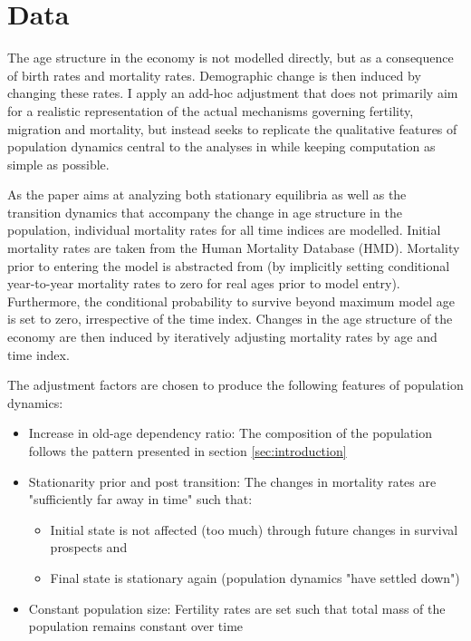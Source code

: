 \section{Data}
\label{sec:data}

The age structure in the economy is not modelled directly, but as a consequence of birth rates and mortality rates. Demographic change is then induced by changing these rates. I apply an add-hoc adjustment that does not primarily aim for a realistic representation of the actual mechanisms governing fertility, migration and mortality, but instead seeks to replicate the qualitative features of population dynamics central to the analyses in \cite{LudwigSchelkleVogel2012} while keeping computation as simple as possible.

As the paper aims at analyzing both stationary equilibria as well as the transition dynamics that accompany the change in age structure in the population, individual mortality rates for all time indices are modelled. Initial mortality rates are taken from the Human Mortality Database (HMD). Mortality prior to entering the model is abstracted from (by implicitly setting conditional year-to-year mortality rates to zero for real ages prior to model entry). Furthermore, the conditional probability to survive beyond maximum model age is set to zero, irrespective of the time index. Changes in the age structure of the economy are then induced by iteratively adjusting mortality rates by age and time index.

The adjustment factors are chosen to produce the following features of population dynamics:
\begin{itemize}
    \item Increase in old-age dependency ratio: The composition of the population follows the pattern presented in section \ref{sec:introduction}
    \item Stationarity prior and post transition: The changes in mortality rates are "sufficiently far away in time" such that:
        \begin{itemize}
            \item Initial state is not affected (too much) through future changes in survival prospects and
            \item Final state is stationary again (population dynamics "have settled down")
        \end{itemize}
    \item Constant population size: Fertility rates are set such that total mass of the population remains constant over time
\end{itemize}

